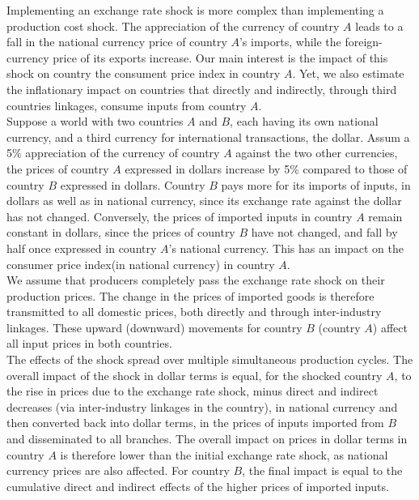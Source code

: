 \documentclass[11pt,a4paper]{article}
\begin{document}
Implementing an exchange rate shock is more complex than implementing a production cost shock. 
The appreciation of the currency of country $A$ leads to a fall in the national currency price of country $A$'s imports, while the foreign-currency price of its exports increase. 
Our main interest is the impact of this shock on country the consument price index in country $A$. 
Yet, we also estimate the inflationary impact on countries that directly and indirectly, through third countries linkages, consume inputs from country $A$.\\
Suppose a world with two countries $A$ and $B$, each having its own national currency, and a third currency for international transactions, the dollar.
Assum a 5$\%$ appreciation of the currency of country $A$ against the two other currencies, the prices of country $A$ expressed in dollars increase by 5$\%$ compared to those of country $B$ expressed in dollars. 
Country $B$ pays more for its imports of inputs, in dollars as well as in national currency, since its exchange rate against the dollar has not changed. 
Conversely, the prices of imported inputs in country $A$ remain constant in dollars, since the prices of country $B$ have not changed, and fall by half once expressed in country $A$'s national currency. This has an impact on the consumer price index(in national currency) in country $A$.\\
We assume that producers completely pass the exchange rate shock on their production prices. 
The change in the prices of imported goods is therefore transmitted to all domestic prices, both directly and through inter-industry linkages. 
These upward (downward) movements for country $B$ (country $A$) affect all input prices in both countries.\\
The effects of the shock spread over multiple simultaneous production cycles. The overall impact of the shock in dollar terms is equal, for the shocked country $A$, to the rise in prices due to the exchange rate shock, minus direct and indirect decreases (via inter-industry linkages in the country), in national currency and then converted back into dollar terms, in the prices of inputs imported from $B$ and disseminated to all branches. 
The overall impact on prices in dollar terms in country $A$ is therefore lower than the initial exchange rate shock, as national currency prices are also affected. 
For country $B$, the final impact is equal to the cumulative direct and indirect effects of the higher prices of imported inputs.\\
\end{document}

